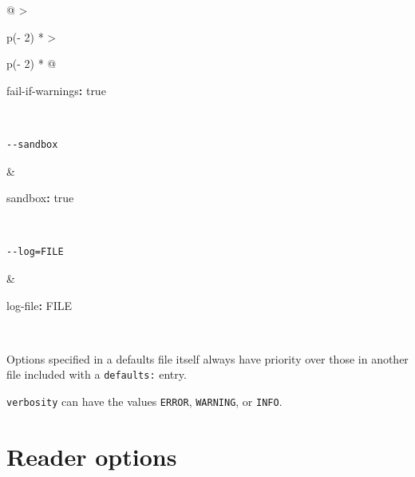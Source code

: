 \documentclass[
  b5paper
]{book}
\newenvironment{Shaded}{}{}
\newcommand{\AttributeTok}[1]{\textcolor[rgb]{0.49,0.56,0.16}{#1}}
\newcommand{\CharTok}[1]{\textcolor[rgb]{0.25,0.44,0.63}{#1}}
\newcommand{\FunctionTok}[1]{\textcolor[rgb]{0.02,0.16,0.49}{#1}}
\newcommand{\KeywordTok}[1]{\textcolor[rgb]{0.00,0.44,0.13}{\textbf{#1}}}
\begin{document}
\begin{longtable}[]{@{}
  >{\raggedright\arraybackslash}p{(\columnwidth - 2\tabcolsep) * }
  >{\raggedright\arraybackslash}p{(\columnwidth - 2\tabcolsep) * }@{}}
\begin{minipage}[t]{\linewidth}
\begin{Shaded}
\begin{Highlighting}[]
\FunctionTok{fail{-}if{-}warnings}\KeywordTok{:}\AttributeTok{ }\CharTok{true}
\end{Highlighting}
\end{Shaded}
\end{minipage} \\
\begin{minipage}[t]{\linewidth}\raggedright
\begin{verbatim}
--sandbox
\end{verbatim}
\end{minipage} & \begin{minipage}[t]{\linewidth}\raggedright
\begin{Shaded}
\begin{Highlighting}[]
\FunctionTok{sandbox}\KeywordTok{:}\AttributeTok{ }\CharTok{true}
\end{Highlighting}
\end{Shaded}
\end{minipage} \\
\begin{minipage}[t]{\linewidth}\raggedright
\begin{verbatim}
--log=FILE
\end{verbatim}
\end{minipage} & \begin{minipage}[t]{\linewidth}\raggedright
\begin{Shaded}
\begin{Highlighting}[]
\FunctionTok{log{-}file}\KeywordTok{:}\AttributeTok{ FILE}
\end{Highlighting}
\end{Shaded}
\end{minipage} \\
\end{longtable}

Options specified in a defaults file itself always have priority over
those in another file included with a \texttt{defaults:} entry.

\texttt{verbosity} can have the values \texttt{ERROR}, \texttt{WARNING},
or \texttt{INFO}.

\section{Reader options}\label{reader-options-1}
\end{document}
